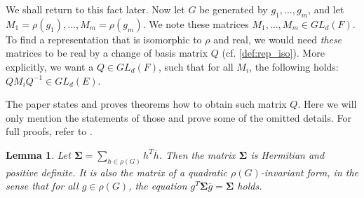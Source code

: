 \documentclass[11pt]{article}
\newtheorem{lemma}[theorem]{Lemma}
\begin{document}
We shall return to this fact later. Now let $G$ be generated by
$g_1, \ldots, g_m$, and let $M_1 = \rho(g_1), \ldots, M_m = \rho(g_m)$.
We note these matrices $M_1, \ldots, M_m \in GL_d(F)$. To find a representation
that is isomorphic to $\rho$ and real, we would need \textit{these} matrices to
be real by a change of basis matrix $Q$ (cf. \cref{def:rep_iso}). More explicitly,
we want a $Q \in GL_d(F)$, such that for all $M_i$, the following holds:
$QM_iQ^{-1} \in GL_d(E)$.

The paper \cite{Pas21} states and proves theorems how to obtain such matrix $Q$.
Here we will only mention the statements of those and prove some of the omitted
details. For full proofs, refer to \cite[Lemma 3.1, 3.2]{Pas21}.
\begin{lemma}
  Let $\mathbf{\Sigma} = \sum_{h \in \rho(G)} h^T\overline{h}$. Then the matrix
  $\mathbf{\Sigma}$ is Hermitian and positive definite. It is also the matrix of
  a quadratic $\rho(G)$-invariant form, in the sense that for all $g \in \rho(G)$,
  the equation $g^T\mathbf{\Sigma}\overline{g} = \mathbf{\Sigma}$ holds.
\end{lemma}
\end{document}
